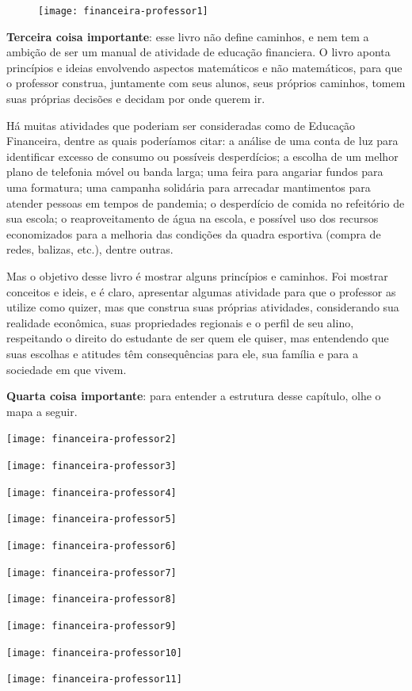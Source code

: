 \begin{paginatexto}
\begin{figure}[H]
\centering

\texttt{[image: financeira-professor1]}
\end{figure}

\textbf{Terceira coisa importante}: esse livro não define caminhos, e nem tem a ambição de ser um manual de atividade de educação financiera. O livro aponta princípios e ideias envolvendo aspectos matemáticos e não matemáticos, para que o professor construa, juntamente com seus alunos, seus próprios caminhos, tomem suas próprias decisões e decidam por onde querem ir.

Há muitas atividades que poderiam ser consideradas como de Educação Financeira, dentre as quais poderíamos citar: a análise de uma conta de luz para identificar excesso de consumo ou possíveis desperdícios; a escolha de um melhor plano de telefonia móvel ou banda larga; uma feira para angariar fundos para uma formatura; uma campanha solidária para arrecadar mantimentos para atender pessoas em tempos de pandemia; o desperdício de comida no refeitório de sua escola; o reaproveitamento de água na escola, e possível uso dos recursos economizados para a melhoria das condições da quadra esportiva (compra de redes, balizas, etc.), dentre outras.

Mas o objetivo desse livro é mostrar alguns princípios e caminhos. Foi mostrar conceitos e ideis, e é claro, apresentar algumas atividade para que o professor as utilize como quizer, mas que construa suas próprias atividades, considerando sua realidade econômica, suas propriedades regionais e o perfil de seu alino, respeitando o direito do estudante de ser quem ele quiser, mas entendendo que suas escolhas e atitudes têm consequências para ele, sua família e para a sociedade em que vivem.

\textbf{Quarta coisa importante}: para entender a estrutura desse capítulo, olhe o mapa a seguir.


\relax
\texttt{[image: financeira-professor2]}

\texttt{[image: financeira-professor3]}

\texttt{[image: financeira-professor4]}

\texttt{[image: financeira-professor5]}

\texttt{[image: financeira-professor6]}

\texttt{[image: financeira-professor7]}

\texttt{[image: financeira-professor8]}

\texttt{[image: financeira-professor9]}

\texttt{[image: financeira-professor10]}

\texttt{[image: financeira-professor11]}


\end{paginatexto}
